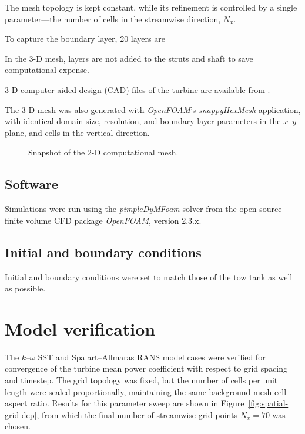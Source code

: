 \documentclass[aip,graphicx]{revtex4-1}
\begin{document}
The mesh topology is kept constant, while its refinement is controlled by a
single parameter---the number of cells in the streamwise direction, $N_x$. 

To capture the boundary layer, 20 layers are

In the 3-D mesh, layers are not added to the struts and shaft to save
computational expense.

3-D computer aided design (CAD) files of the turbine are available from
\cite{Bachant2014-RVAT-CAD}.

The 3-D mesh was also generated with \textit{OpenFOAM}'s \textit{snappyHexMesh}
application, with identical domain size, resolution, and boundary layer
parameters in the $x$--$y$ plane, and 
cells in the vertical direction.

\begin{figure}[ht]
\caption{Snapshot of the 2-D computational mesh.}
\label{fig:mesh}
\end{figure}

\subsection{Software}

Simulations were run using the \textit{pimpleDyMFoam} solver from the
open-source finite volume CFD package \textit{OpenFOAM}, version 2.3.x.

\subsection{Initial and boundary conditions}

Initial and boundary conditions were set to match those of the tow tank as well
as possible. 

\section{Model verification}

The $k$--$\omega$ SST and Spalart--Allmaras RANS model cases were verified for
convergence of the turbine mean power coefficient with respect to grid spacing
and timestep. The grid topology was fixed, but the number of cells per unit
length were scaled proportionally, maintaining the same background mesh cell
aspect ratio. Results for this parameter sweep are shown in 
Figure~\ref{fig:spatial-grid-dep}, from which the final number of streamwise
grid points $N_x = 70$ was chosen.
\end{document}

